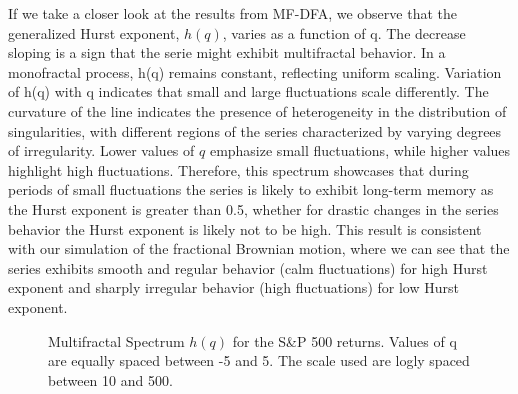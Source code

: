 \documentclass[11pt]{extarticle}
\begin{document}
\FloatBarrier


If we take a closer look at the results from MF-DFA, we observe that the generalized Hurst exponent, $h(q)$,
varies as a function of q. The decrease sloping is a sign that the serie might exhibit multifractal behavior.
In a monofractal process, h(q) remains constant, reflecting uniform scaling.
Variation of h(q) with q indicates that small and large fluctuations scale differently.
The curvature of the line indicates the presence of heterogeneity in the distribution of singularities, with
different regions of the series characterized by varying degrees of irregularity.
Lower values of $q$ emphasize small fluctuations, while higher values highlight high fluctuations.
Therefore, this spectrum showcases that during periods of small fluctuations the series is likely to exhibit long-term
memory as the Hurst exponent is greater than 0.5, whether for drastic changes in the series behavior the Hurst exponent
is likely not to be high.
This result is consistent with our simulation of the fractional Brownian motion, where we can see that the
series exhibits smooth and regular behavior (calm fluctuations) for high Hurst exponent and sharply irregular behavior
(high fluctuations) for low Hurst exponent.


\begin{figure}[htbp]
    \centering
    \caption{Multifractal Spectrum $h(q)$ for the S\&P 500 returns. Values of q are equally spaced between -5 and 5.
    The scale used are logly spaced between 10 and 500.}
\end{figure}

\FloatBarrier
\end{document}
